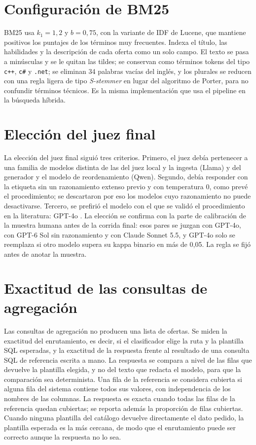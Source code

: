 \section{Configuración de BM25}
\label{anx:bm25}

BM25 \citep{Robertson2009} usa $k_1 = 1{,}2$ y $b = 0{,}75$, con la variante de IDF de Lucene, que mantiene positivos los puntajes de los términos muy frecuentes. Indexa el título, las habilidades y la descripción de cada oferta como un solo campo. El texto se pasa a minúsculas y se le quitan las tildes; se conservan como términos tokens del tipo \texttt{c++}, \texttt{c\#} y \texttt{.net}; se eliminan 34 palabras vacías del inglés, y los plurales se reducen con una regla ligera de tipo \textit{S-stemmer} en lugar del algoritmo de Porter, para no confundir términos técnicos. Es la misma implementación que usa el pipeline en la búsqueda híbrida.

\section{Elección del juez final}
\label{anx:juez-final}

La elección del juez final siguió tres criterios. Primero, el juez debía pertenecer a una familia de modelos distinta de las del juez local y la ingesta (Llama) y del generador y el modelo de reordenamiento (Qwen). Segundo, debía responder con la etiqueta sin un razonamiento extenso previo y con temperatura 0, como prevé el procedimiento; se descartaron por eso los modelos cuyo razonamiento no puede desactivarse. Tercero, se prefirió el modelo con el que se validó el procedimiento en la literatura: GPT-4o \citep{Upadhyay2024}. La elección se confirma con la parte de calibración de la muestra humana antes de la corrida final: esos pares se juzgan con GPT-4o, con GPT-6 Sol sin razonamiento y con Claude Sonnet 5.5, y GPT-4o solo se reemplaza si otro modelo supera su kappa binario en más de 0,05. La regla se fijó antes de anotar la muestra.

\section{Exactitud de las consultas de agregación}
\label{anx:agregacion}

Las consultas de agregación no producen una lista de ofertas. Se miden la exactitud del enrutamiento, es decir, si el clasificador elige la ruta y la plantilla SQL esperadas, y la exactitud de la respuesta frente al resultado de una consulta SQL de referencia escrita a mano. La respuesta se compara a nivel de las filas que devuelve la plantilla elegida, y no del texto que redacta el modelo, para que la comparación sea determinista. Una fila de la referencia se considera cubierta si alguna fila del sistema contiene todos sus valores, con independencia de los nombres de las columnas. La respuesta es exacta cuando todas las filas de la referencia quedan cubiertas; se reporta además la proporción de filas cubiertas. Cuando ninguna plantilla del catálogo devuelve directamente el dato pedido, la plantilla esperada es la más cercana, de modo que el enrutamiento puede ser correcto aunque la respuesta no lo sea.


